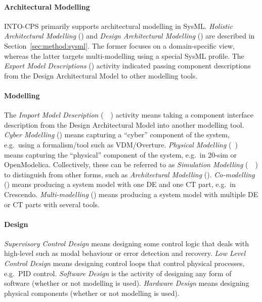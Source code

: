 \paragraph{Architectural Modelling}

INTO-CPS primarily supports architectural modelling in SysML. \emph{Holistic Architectural Modelling} (\Modelio) and \emph{Design Architectural Modelling} (\Modelio) are described in Section~\ref{sec:method:sysml}. The former focuses on a domain-specific view, whereas the latter targets multi-modelling using a special SysML profile. The \emph{Export Model Descriptions} (\Modelio) activity indicated passing component descriptions from the Design Architectural Model to other modelling tools.

\paragraph{Modelling}

The \emph{Import Model Description} (\Overture~\TwentySim~\OpenModelica) activity means taking a component interface description from the Design Architectural Model into another modelling tool. \emph{Cyber Modelling} (\Overture) means capturing a ``cyber'' component of the system, e.g.\ using a formalism/tool such as VDM/Overture. \emph{Physical Modelling} (\TwentySim~\OpenModelica) means capturing the ``physical'' component of the system, e.g.\ in 20-sim  or OpenModelica. Collectively, these can be referred to as \emph{Simulation Modelling} (\Overture~\TwentySim~\OpenModelica) to distinguish from other forms, such as \emph{Architectural Modelling} (\Modelio). \emph{Co-modelling} (\Crescendo) means producing a system model with one DE and one CT part, e.g.\ in Crescendo. \emph{Multi-modelling} (\INTOCPS) means producing a system model with multiple DE or CT parts with several tools.

\paragraph{Design}

\emph{Supervisory Control Design} means designing some control logic that deals with high-level such as modal behaviour or error detection and recovery. \emph{Low Level Control Design} means designing control loops that control physical processes, e.g.\ PID control. \emph{Software Design} is the activity of designing any form of software (whether or not modelling is used). \emph{Hardware Design} means designing physical components (whether or not modelling is used).

